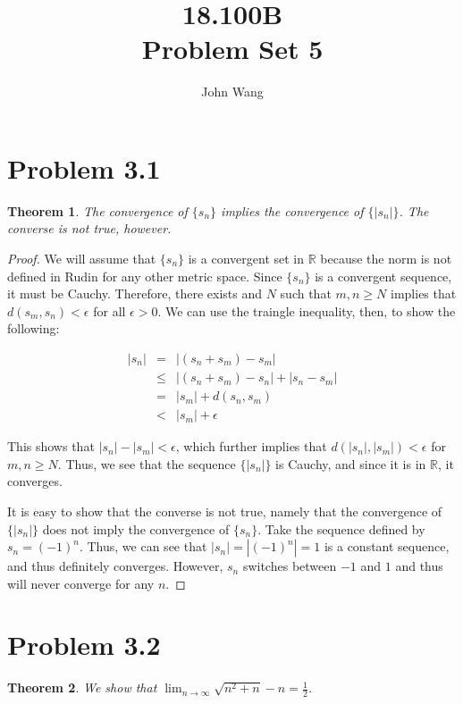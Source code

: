 \documentclass[psamsfonts]{amsart}
\title{18.100B \\
Problem Set 5}
\author{John Wang}
\newtheorem{thm}{Theorem}[section]
\theoremstyle{definition}
\theoremstyle{remark}
\numberwithin{equation}{section}
\begin{document}
\maketitle


\section{Problem 3.1}

\begin{thm}
The convergence of $\{ s_n \}$ implies the convergence of $\{ | s_n | \}$. The converse is not true, however.
\end{thm}

\begin{proof}
We will assume that $\{ s_n \}$ is a convergent set in $\mathbb{R}$ because the norm is not defined in Rudin for any other metric space. Since $\{ s_n \}$ is a convergent sequence, it must be Cauchy. Therefore, there exists and $N$ such that $m,n \geq N$ implies that $d(s_m,s_n) < \epsilon$ for all $\epsilon > 0$. We can use the traingle inequality, then, to show the following:

\begin{eqnarray}
|s_n| &=& |(s_n + s_m) - s_m | \\
& \leq & |(s_n + s_m) - s_n| + | s_n - s_m| \nonumber \\
&=& |s_m | + d(s_n,s_m) \nonumber \\
&<& |s_m| + \epsilon \nonumber
\end{eqnarray}

This shows that $|s_n| - |s_m| < \epsilon$, which further implies that $d(|s_n|,|s_m|) < \epsilon$ for $m,n \geq N$. Thus, we see that the sequence $\{ | s_n | \}$ is Cauchy, and since it is in $\mathbb{R}$, it converges.

It is easy to show that the converse is not true, namely that the convergence of $\{ |s_n | \}$ does not imply the convergence of $\{ s_n \}$. Take the sequence defined by $s_n = (-1)^n$. Thus, we can see that $|s_n| = |(-1)^n| = 1$ is a constant sequence, and thus definitely converges. However, $s_n$ switches between $-1$ and $1$ and thus will never converge for any $n$. 
 
\end{proof}

\section{Problem 3.2}

\begin{thm}
We show that $\lim_{ n \to \infty} \sqrt{n^2 + n} - n = \frac{1}{2}$.
\end{thm}
\end{document}
